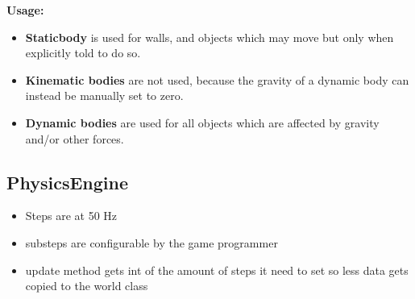 \noindent
\textbf{Usage:}
\begin{itemize}
    \item \textbf{Staticbody} is used for walls, and objects which may move but only when explicitly told to do so.
    \item \textbf{Kinematic bodies} are not used, because the gravity of a dynamic body can instead be manually set to zero.
    \item \textbf{Dynamic bodies} are used for all objects which are affected by gravity and/or other forces.
\end{itemize}

\subsection{PhysicsEngine}{
  \begin{itemize}
      \item Steps are at 50 Hz
      \item substeps are configurable by the game programmer
      \item update method gets int of the amount of steps it need to set so less data gets copied to the world class
  \end{itemize}
 }